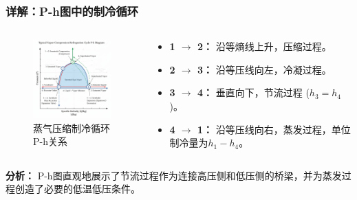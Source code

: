 \documentclass{beamer}
\begin{document}
\begin{frame}
    \frametitle{详解：P-h图中的制冷循环}
    \begin{columns}
        \begin{column}{0.5\textwidth}
           \begin{figure}
             \centering
             \includegraphics[width=5cm]{image copy.png}
             \caption{蒸气压缩制冷循环P-h关系}
           \end{figure}
        \end{column}
        \begin{column}{0.5\textwidth}
          \begin{itemize}
              \item \textbf{1 $\rightarrow$ 2：} 沿等熵线上升，\alert{压缩过程}。
              \item \textbf{2 $\rightarrow$ 3：} 沿等压线向左，\alert{冷凝过程}。
              \item \textbf{3 $\rightarrow$ 4：} 垂直向下，\alert{节流过程} ($h_3 = h_4$)。
              \item \textbf{4 $\rightarrow$ 1：} 沿等压线向右，\alert{蒸发过程}，单位制冷量为$h_1 - h_4$。
          \end{itemize}
        \end{column}
    \end{columns}
    \vfill
    \textbf{分析：} P-h图直观地展示了节流过程作为连接高压侧和低压侧的桥梁，并为蒸发过程创造了必要的低温低压条件。
\end{frame}
\end{document}
